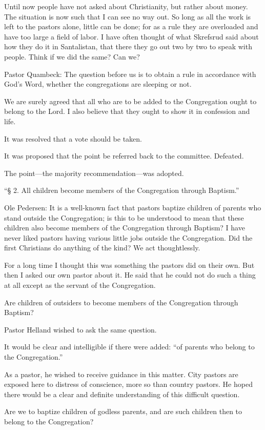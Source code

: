 Until now people have not asked about Christianity, but rather about money. The situation is now such that I can see no way out. So long as all the work is left to the pastors alone, little can be done; for as a rule they are overloaded and have too large a field of labor. I have often thought of what Skrefsrud said about how they do it in Santalistan, that there they go out two by two to speak with people. Think if we did the same? Can we?

Pastor Quambeck: The question before us is to obtain a rule in accordance with God’s Word, whether the congregations are sleeping or not.

We are surely agreed that all who are to be added to the Congregation ought to belong to the Lord. I also believe that they ought to show it in confession and life.

It was resolved that a vote should be taken.

It was proposed that the point be referred back to the committee. Defeated.

The point—the majority recommendation—was adopted.

“§ 2. All children become members of the Congregation through Baptism.”

Ole Pedersen: It is a well-known fact that pastors baptize children of parents who stand outside the Congregation; is this to be understood to mean that these children also become members of the Congregation through Baptism? I have never liked pastors having various little jobs outside the Congregation. Did the first Christians do anything of the kind? We act thoughtlessly.

For a long time I thought this was something the pastors did on their own. But then I asked our own pastor about it. He said that he could not do such a thing at all except as the servant of the Congregation.

Are children of outsiders to become members of the Congregation through Baptism?

Pastor Helland wished to ask the same question.

It would be clear and intelligible if there were added: “of parents who belong to the Congregation.”

As a pastor, he wished to receive guidance in this matter. City pastors are exposed here to distress of conscience, more so than country pastors. He hoped there would be a clear and definite understanding of this difficult question.

Are we to baptize children of godless parents, and are such children then to belong to the Congregation?

